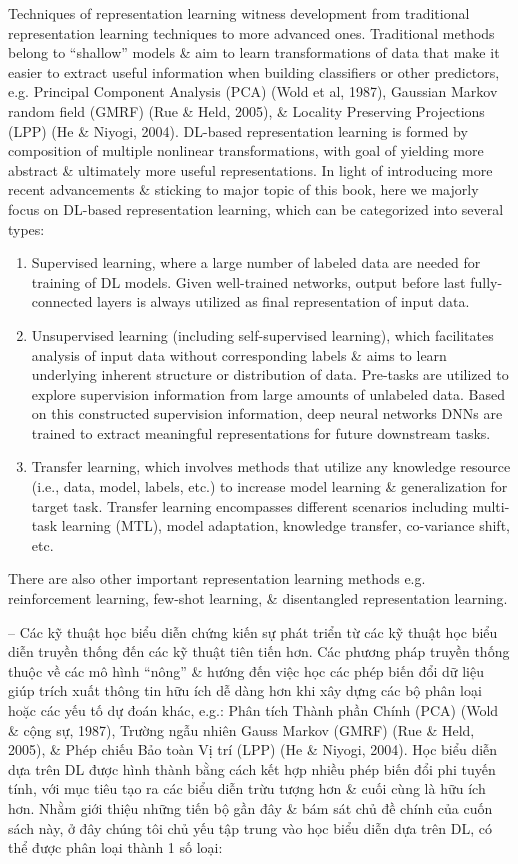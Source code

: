 \documentclass{article}
\begin{document}
\begin{itemize}
\begin{itemize}
        Techniques of representation learning witness development from traditional representation learning techniques to more advanced ones. Traditional methods belong to ``shallow'' models \& aim to learn transformations of data that make it easier to extract useful information when building classifiers or other predictors, e.g. Principal Component Analysis (PCA) (Wold et al, 1987), Gaussian Markov random field (GMRF) (Rue \& Held, 2005), \& Locality Preserving Projections (LPP) (He \& Niyogi, 2004). DL-based representation learning is formed by composition of multiple nonlinear transformations, with goal of yielding more abstract \& ultimately more useful representations. In light of introducing more recent advancements \& sticking to major topic of this book, here we majorly focus on DL-based representation learning, which can be categorized into several types:
        \begin{enumerate}
            \item Supervised learning, where a large number of labeled data are needed for training of DL models. Given well-trained networks, output before last fully-connected layers is always utilized as final representation of input data.
            \item Unsupervised learning (including self-supervised learning), which facilitates analysis of input data without corresponding labels \& aims to learn underlying inherent structure or distribution of data. Pre-tasks are utilized to explore supervision information from large amounts of unlabeled data. Based on this constructed supervision information, deep neural networks DNNs are trained to extract meaningful representations for future downstream tasks.
            \item Transfer learning, which involves methods that utilize any knowledge resource (i.e., data, model, labels, etc.) to increase model learning \& generalization for target task. Transfer learning encompasses different scenarios including multi-task learning (MTL), model adaptation, knowledge transfer, co-variance shift, etc.
        \end{enumerate}
        There are also other important representation learning methods e.g. reinforcement learning, few-shot learning, \& disentangled representation learning.

        -- Các kỹ thuật học biểu diễn chứng kiến sự phát triển từ các kỹ thuật học biểu diễn truyền thống đến các kỹ thuật tiên tiến hơn. Các phương pháp truyền thống thuộc về các mô hình ``nông'' \& hướng đến việc học các phép biến đổi dữ liệu giúp trích xuất thông tin hữu ích dễ dàng hơn khi xây dựng các bộ phân loại hoặc các yếu tố dự đoán khác, e.g.: Phân tích Thành phần Chính (PCA) (Wold \& cộng sự, 1987), Trường ngẫu nhiên Gauss Markov (GMRF) (Rue \& Held, 2005), \& Phép chiếu Bảo toàn Vị trí (LPP) (He \& Niyogi, 2004). Học biểu diễn dựa trên DL được hình thành bằng cách kết hợp nhiều phép biến đổi phi tuyến tính, với mục tiêu tạo ra các biểu diễn trừu tượng hơn \& cuối cùng là hữu ích hơn. Nhằm giới thiệu những tiến bộ gần đây \& bám sát chủ đề chính của cuốn sách này, ở đây chúng tôi chủ yếu tập trung vào học biểu diễn dựa trên DL, có thể được phân loại thành 1 số loại:


\end{itemize}
\end{itemize}
\end{document}
